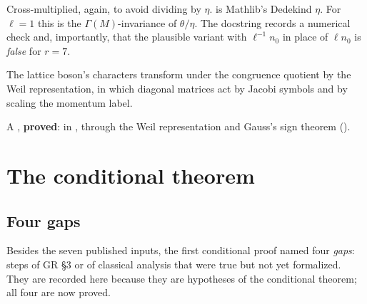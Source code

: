 \begin{dictionary}
Cross-multiplied, again, to avoid dividing by $\eta$.  is Mathlib's Dedekind $\eta$. For
$\ell=1$ this is the $\Gamma(M)$-invariance of $\theta/\eta$. The docstring records a numerical check and,
importantly, that the plausible variant with $\ell^{-1}n_0$ in place of $\ell n_0$ is \emph{false} for $r=7$.
\end{dictionary}

\begin{physics}
The lattice boson's characters transform under the congruence quotient by the Weil representation, in which
diagonal matrices act by Jacobi symbols and by scaling the momentum label.
\end{physics}

\begin{status}
A , \textbf{proved}:  in
, through the Weil
representation and Gauss's sign theorem ().
\end{status}

\section{The conditional theorem}\label{l22:sec:conditional}

\subsection{Four gaps}

Besides the seven published inputs, the first conditional proof named four \emph{gaps}: steps of GR §3 or of
classical analysis that were true but not yet formalized. They are recorded here because they are hypotheses of
the conditional theorem; all four are now proved.

